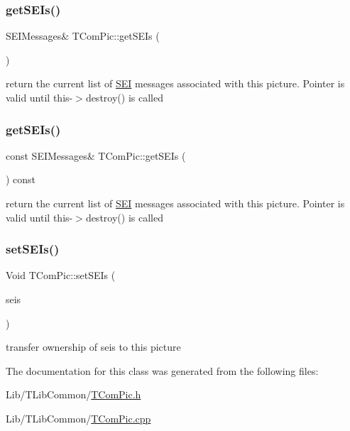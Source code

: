\subsubsection{\texorpdfstring{get\+S\+E\+Is()}{getSEIs()}\hspace{0.1cm}{\footnotesize\ttfamily [1/2]}}
{\footnotesize\ttfamily S\+E\+I\+Messages\& T\+Com\+Pic\+::get\+S\+E\+Is (\begin{DoxyParamCaption}{ }\end{DoxyParamCaption})\hspace{0.3cm}{\ttfamily [inline]}}

return the current list of \hyperlink{class_s_e_i}{S\+EI} messages associated with this picture. Pointer is valid until this-\/$>$destroy() is called \mbox{\label{class_t_com_pic_a2aaa31be1763985ca743712cbe1cd1d5}} 
\subsubsection{\texorpdfstring{get\+S\+E\+Is()}{getSEIs()}\hspace{0.1cm}{\footnotesize\ttfamily [2/2]}}
{\footnotesize\ttfamily const S\+E\+I\+Messages\& T\+Com\+Pic\+::get\+S\+E\+Is (\begin{DoxyParamCaption}{ }\end{DoxyParamCaption}) const\hspace{0.3cm}{\ttfamily [inline]}}

return the current list of \hyperlink{class_s_e_i}{S\+EI} messages associated with this picture. Pointer is valid until this-\/$>$destroy() is called \mbox{\label{class_t_com_pic_a7621684d3f2806eddff9868fc5f76c4e}} 
\subsubsection{\texorpdfstring{set\+S\+E\+Is()}{setSEIs()}}
{\footnotesize\ttfamily Void T\+Com\+Pic\+::set\+S\+E\+Is (\begin{DoxyParamCaption}\item[{S\+E\+I\+Messages \&}]{seis }\end{DoxyParamCaption})\hspace{0.3cm}{\ttfamily [inline]}}

transfer ownership of seis to this picture 

The documentation for this class was generated from the following files\+:\begin{DoxyCompactItemize}
\item 
Lib/\+T\+Lib\+Common/\hyperlink{_t_com_pic_8h}{T\+Com\+Pic.\+h}\item 
Lib/\+T\+Lib\+Common/\hyperlink{_t_com_pic_8cpp}{T\+Com\+Pic.\+cpp}\end{DoxyCompactItemize}

